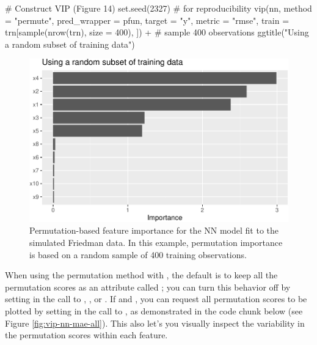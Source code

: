\begin{Schunk}
\begin{Sinput}
# Construct VIP (Figure 14)
set.seed(2327)  # for reproducibility
vip(nn, method = "permute", pred_wrapper = pfun, target = "y", metric = "rmse",
    train = trn[sample(nrow(trn), size = 400), ]) +  # sample 400 observations
  ggtitle("Using a random subset of training data")
\end{Sinput}
\begin{figure}[!htb]

{\centering \includegraphics[width=0.7\linewidth]{greenwell-boehmke_files/figure-latex/vip-permute-nn-sample-1}

}

\caption[Permutation-based feature importance for the NN model fit to the simulated Friedman data]{Permutation-based feature importance for the NN model fit to the simulated Friedman data. In this example, permutation importance is based on a random sample of 400 training observations.}\label{fig:vip-permute-nn-sample}
\end{figure}
\end{Schunk}

When using the permutation method with , the default is
to keep all the permutation scores as an attribute called
; you can turn this behavior off by setting
 in the call to , , or
. If  and , you can request
all permutation scores to be plotted by setting
 in the call to , as
demonstrated in the code chunk below (see Figure
\ref{fig:vip-nn-mae-all}). This also let's you visually inspect the
variability in the permutation scores within each feature.

